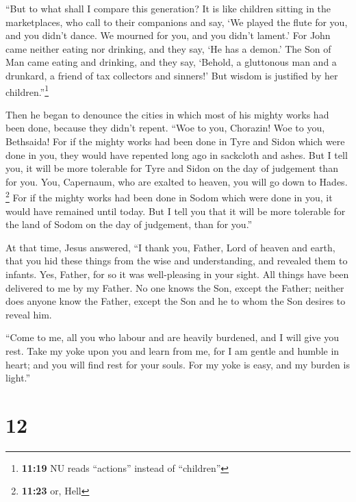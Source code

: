 ``But to what shall I compare this generation? It is
like children sitting in the marketplaces, who call to their companions
 and say, `We played the flute for you, and you didn't
dance. We mourned for you, and you didn't lament.'  For
John came neither eating nor drinking, and they say, `He has a demon.'
 The Son of Man came eating and drinking, and they say,
`Behold, a gluttonous man and a drunkard, a friend of tax collectors and
sinners!' But wisdom is justified by her children.''\footnote{\textbf{11:19}
  NU reads ``actions'' instead of ``children''}

 Then he began to denounce the cities in which most of
his mighty works had been done, because they didn't repent.
 ``Woe to you, Chorazin! Woe to you, Bethsaida! For if
the mighty works had been done in Tyre and Sidon which were done in you,
they would have repented long ago in sackcloth and ashes.
 But I tell you, it will be more tolerable for Tyre and
Sidon on the day of judgement than for you.  You,
Capernaum, who are exalted to heaven, you will go down to Hades.
\footnote{\textbf{11:23} or, Hell} For if the mighty works had been done
in Sodom which were done in you, it would have remained until today.
 But I tell you that it will be more tolerable for the
land of Sodom on the day of judgement, than for you.''

 At that time, Jesus answered, ``I thank you, Father,
Lord of heaven and earth, that you hid these things from the wise and
understanding, and revealed them to infants.  Yes,
Father, for so it was well-pleasing in your sight.  All
things have been delivered to me by my Father. No one knows the Son,
except the Father; neither does anyone know the Father, except the Son
and he to whom the Son desires to reveal him.

 ``Come to me, all you who labour and are heavily
burdened, and I will give you rest.  Take my yoke upon
you and learn from me, for I am gentle and humble in heart; and you will
find rest for your souls.  For my yoke is easy, and my
burden is light.''

\hypertarget{section-11}{%
\section{12}\label{section-11}}

